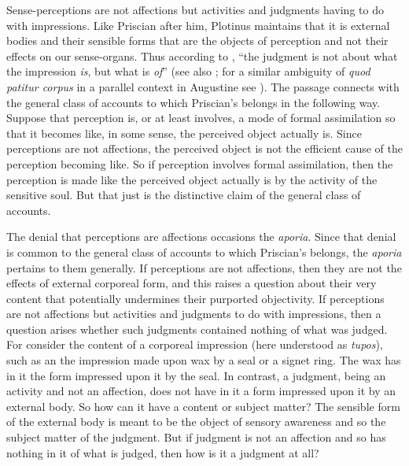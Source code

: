 \documentclass[12pt]{article}
\begin{document}
Sense-perceptions are not affections but activities and judgments having to do with impressions. Like Priscian after him, Plotinus maintains that it is external bodies and their sensible forms that are the objects of perception and not their effects on our sense-organs. Thus according to \citet[73]{Fleet:1995gf}, ``the judgment is not about what the impression \emph{is}, but what is \emph{of}'' (see also \citealt[75 n.28]{Emilsson:1988uq}; for a similar ambiguity of \emph{quod patitur corpus} in a parallel context in Augustine see \citealt{Brittain:2002hl}). The passage connects with the general class of accounts to which Priscian's belongs in the following way. Suppose that perception is, or at least involves, a mode of formal assimilation so that it becomes like, in some sense, the perceived object actually is. Since perceptions are not affections, the perceived object is not the efficient cause of the perception becoming like. So if perception involves formal assimilation, then the perception is made like the perceived object actually is by the activity of the sensitive soul. But that just is the distinctive claim of the general class of accounts.

The denial that perceptions are affections occasions the \emph{aporia}. Since that denial is common to the general class of accounts to which Priscian's belongs, the \emph{aporia} pertains to them generally. If perceptions are not affections, then they are not the effects of external corporeal form, and this raises a question about their very content that potentially undermines their purported objectivity. If perceptions are not affections but activities and judgments to do with impressions, then a question arises whether such judgments contained nothing of what was judged. For consider the content of a corporeal impression (here understood as \emph{tupos}), such as an the impression made upon wax by a seal or a signet ring. The wax has in it the form impressed upon it by the seal. In contrast, a judgment, being an activity and not an affection, does not have in it a form impressed upon it by an external body. So how can it have a content or subject matter? The sensible form of the external body is meant to be the object of sensory awareness and so the subject matter of the judgment. But if judgment is not an affection and so has nothing in it of what is judged, then how is it a judgment at all?
\end{document}
